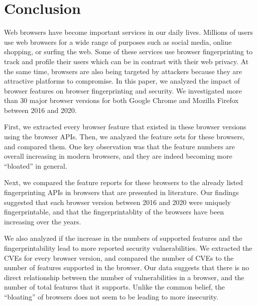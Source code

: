 \section{Conclusion}
\label{sec:conclusion}

Web browsers have become important services in our daily lives.
Millions of users use web browsers for a wide range of purposes such
as social media, online shopping, or surfing the web. Some of these
services use browser fingerprinting to track and profile their users
which can be in contrast with their web privacy. At the same time,
browsers are also being targeted by attackers because they are
attractive platforms to compromise. In this paper, we analyzed the
impact of browser features on browser fingerprinting and security. We
investigated more than 30 major browser versions for both Google
Chrome and Mozilla Firefox between 2016 and 2020.

First, we extracted every browser feature that existed in these
browser versions using the browser APIs. Then, we analyzed the feature
sets for these browsers, and compared them. One key observation was
that the feature numbers are overall increasing in modern browsers,
and they are indeed becoming more ``bloated'' in general.

Next, we compared the feature reports for these browsers to the
already listed fingerprinting APIs in browsers that are presented in
literature. Our findings suggested that each browser version between 2016
and 2020 were uniquely fingerprintable, and that the fingerprintablity
of the browsers have been increasing over the years.

We also analyzed if the increase in the numbers of supported features
and the fingerprintability lead to more reported security
vulnerabilities. We extracted the CVEs for every browser version, and
compared the number of CVEs to the number of features supported in the
browser. Our data suggests that there is no direct relationship
between the number of vulnerabilities in a browser, and the number of
total features that it supports. Unlike the common belief, the
``bloating'' of browsers does not seem to be leading to more
insecurity.
